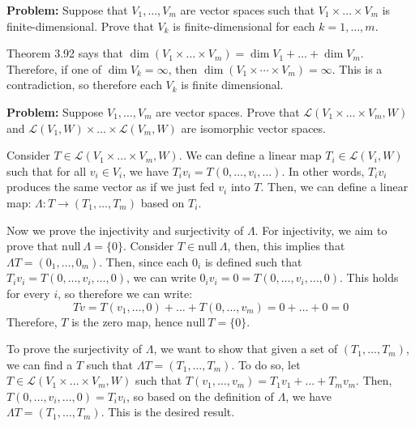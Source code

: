 \documentclass[10pt]{article}
\renewcommand{\null}{\mathrm{null \ }}
\newenvironment{problem}{\textbf{Problem:}}{}
\begin{document}
	\begin{problem}
		Suppose that \( V_1, \dots, V_m \) are vector spaces such that \( V_1 \times  \dots \times  V_m \) 
		is finite-dimensional. Prove that \( V_k \) is finite-dimensional for each \( k = 1, \dots, m \). 
	\end{problem}

	\begin{solution}
		Theorem 3.92 says that \( \dim(V_1 \times \dots \times V_m) = \dim V_1 + \dots + \dim V_m \). Therefore, 
		if one of \( \dim V_k = \infty\), then \( \dim(V_1 \times \cdots \times V_m) = \infty \). This is a 
		contradiction, so therefore each \( V_k \) is finite dimensional. 
	\end{solution}

	\begin{problem}
		Suppose \( V_1, \dots, V_m \) are vector spaces. Prove that 
		\( \mathcal L(V_1 \times \dots \times V_m, W) \) and \( \mathcal L(V_1, W) \times  \dots \times 
		\mathcal L(V_m, W)\) are isomorphic vector spaces. 
	\end{problem}

	\begin{solution}
		Consider \( T \in \mathcal L(V_1 \times \dots \times V_m, W) \). 
		We can define a linear map \( T_i \in  \mathcal L(V_i, W) \) such that for all \( v_i \in V_i \), 
		we have \( T_i v_i = T(0, \dots, v_i, \dots) \). In other words, \( T_i v_i \) produces the same 
		vector as if we just fed \( v_i \) into \( T \). Then, we can define a linear map:
		\( \Lambda: T \to (T_1, \dots, T_m )\) based on \( T_i  \). 	

		Now we prove the injectivity and surjectivity of \( \Lambda \). For injectivity, we aim to prove that 
		\( \null \Lambda = \{ 0\}  \). Consider \( T \in \null \Lambda \), then, this implies that 
		\( \Lambda T = (0_1, \dots, 0_m) \). Then, since each \( 0_i \) is defined such that 
		\( T_i v_i = T(0, \dots, v_i, \dots, 0) \), we can write \( 0_i v_i = 0 = T(0, \dots, v_i, \dots, 0) \). 
		This holds for every \( i \), so therefore we can write:
		\[
		T v = T(v_1, \dots, 0) + \dots + T(0, \dots, v_m) = 0 + \dots + 0 = 0
		\] 
		Therefore, \( T  \) is the zero map, hence \( \null T = \{0\}  \). 

		To prove the surjectivity of \( \Lambda \), we want to show that given a set of \( (T_1, \dots, T_m) \), 
		we can find a \( T \) such that \( \Lambda T = (T_1, \dots, T_m) \). To do so, let 
		\( T \in \mathcal L(V_1 \times \dots \times V_m, W) \) such that \( T(v_1, \dots, v_m) = 
		T_1v_1 + \dots + T_m v_m\). Then, \( T(0, \dots, v_i, \dots, 0) = T_i v_i \), so based on the 
		definition of \( \Lambda \), we have \( \Lambda T = (T_1, \dots, T_m) \). This is 
		the desired result. 
	\end{solution}
\end{document}
